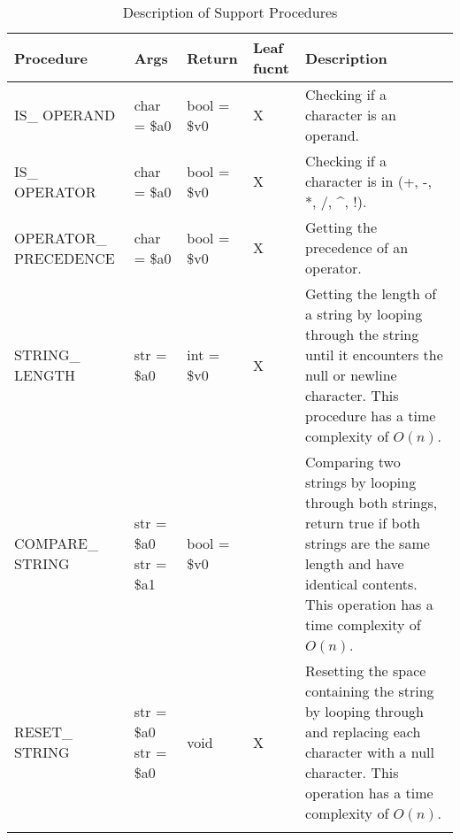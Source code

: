     \begin{longtable}{|m{2.5cm}|m{2.5cm}|m{2.5cm}|m{1cm}|m{5.6cm}|}
        \hline
            \textbf{Procedure} & 
            \textbf{Args} & 
            \textbf{Return} & 
            \centering \textbf{Leaf fucnt} &
            \textbf{Description}\\
        \hline
        \endfirsthead
            IS\_ OPERAND& 
            char = \$a0&
            bool = \$v0&
            \centering X&
            Checking if a character is an operand.\\
        \hline
            IS\_ OPERATOR& 
            char = \$a0&
            bool = \$v0&
            \centering X&
            Checking if a character is in (+, -, *, /, \^{}, !).\\
        \hline
            OPERATOR\_ PRECEDENCE& 
            char = \$a0&
            bool = \$v0&
            \centering X&
            Getting the precedence of an operator.\\
        \hline
            STRING\_ LENGTH& 
            str = \$a0&
            int = \$v0&
            \centering X&
            Getting the length of a string by looping through the string until it encounters the null or newline character. This procedure has a time complexity of \(O(n)\).\\
        \hline
            COMPARE\_ STRING& 
            str = \$a0
            \newline str = \$a1&
            bool = \$v0&
            &
            Comparing two strings by looping through both strings, return true if both strings are the same length and have identical contents. This operation has a time complexity of \(O(n)\).\\
        \hline
            RESET\_ STRING& 
            str = \$a0
            \newline str = \$a0&
            \centering void&
            \centering X&
            Resetting the space containing the string by looping through and replacing each character with a null character. This operation has a time complexity of \(O(n)\).\\
        \hline
        \caption{Description of Support Procedures} \\
    \end{longtable}

